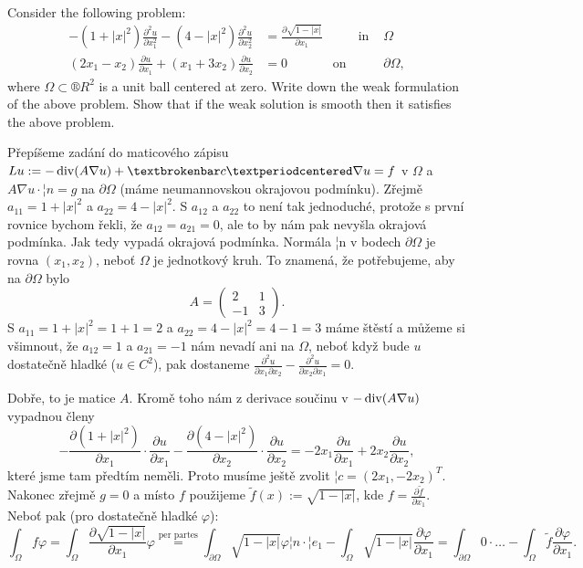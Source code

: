 \documentclass[12pt]{article}					%
\begin{document}
\begin{priklad}[2.]
	Consider the following problem:
	\begin{align*}
		-(1 + |x|^2) \frac{\partial^2 u}{\partial x_1^2} - (4 - |x|^2) \frac{\partial^2 u}{\partial x_2^2} &= \frac{\partial \sqrt{1 - |x|}}{\partial x_1} & \qquad \text{in } & Ω\\
		(2x_1 - x_2) \frac{\partial u}{\partial x_1} + (x_1 + 3x_2) \frac{\partial u}{\partial x_2} &= 0 \qquad & \text{on } & \partial Ω,
	\end{align*}
	where $Ω \subset ®R^2$ is a unit ball centered at zero. Write down the weak formulation of the above problem. Show that if the weak solution is smooth then it satisfies the above problem.

	\begin{reseni}
		Přepíšeme zadání do maticového zápisu $Lu := - \Div(A \nabla u) + ¦c·\nabla u = f$ v $Ω$ a $A\nabla u · ¦n = g$ na $\partial Ω$ (máme neumannovskou okrajovou podmínku). Zřejmě $a_{11} = 1 + |x|^2$ a $a_{22} = 4 - |x|^2$. S $a_{12}$ a $a_{22}$ to není tak jednoduché, protože s první rovnice bychom řekli, že $a_{12} = a_{21} = 0$, ale to by nám pak nevyšla okrajová podmínka. Jak tedy vypadá okrajová podmínka. Normála ¦n v bodech $\partial Ω$ je rovna $(x_1, x_2)$, neboť $Ω$ je jednotkový kruh. To znamená, že potřebujeme, aby na $\partial Ω$ bylo
		$$ A = \begin{pmatrix} 2 & 1 \\ -1 & 3 \end{pmatrix}. $$
		S $a_{11} = 1 + |x|^2 = 1 + 1 = 2$ a $a_{22} = 4 - |x|^2 = 4 - 1 = 3$ máme štěstí a můžeme si všimnout, že $a_{12} = 1$ a $a_{21} = -1$ nám nevadí ani na $Ω$, neboť když bude $u$ dostatečně hladké ($u \in C^2$), pak dostaneme $\frac{\partial^2 u}{\partial x_1 \partial x_2} - \frac{\partial^2 u}{\partial x_2 \partial x_1} = 0$.

		Dobře, to je matice $A$. Kromě toho nám z derivace součinu v $-\operatorname{div}(A \nabla u)$ vypadnou členy
		$$ -\frac{\partial (1 + |x|^2)}{\partial x_1}·\frac{\partial u}{\partial x_1} - \frac{\partial (4 - |x|^2)}{\partial x_2}·\frac{\partial u}{\partial x_2} = -2x_1 \frac{\partial u}{\partial x_1} + 2x_2 \frac{\partial u}{\partial x_2}, $$
		které jsme tam předtím neměli. Proto musíme ještě zvolit $¦c = (2x_1, -2x_2)^T$. Nakonec zřejmě $g = 0$ a místo $f$ použijeme $\tilde f(x) := \sqrt{1 - |x|}$, kde $f = \frac{\partial \tilde f}{\partial x_1}$. Neboť pak (pro dostatečně hladké $φ$):
		$$ \int_Ω f φ = \int_Ω \frac{\partial \sqrt{1 - |x|}}{\partial x_1} φ \overset{\text{per partes}}= \int_{\partial Ω} \sqrt{1 - |x|}φ ¦n·¦e_1 - \int_Ω \sqrt{1 - |x|} \frac{\partial φ}{\partial x_1} = \int_{\partial Ω} 0 · … - \int_Ω \tilde f \frac{\partial φ}{\partial x_1}. $$


\end{reseni}
\end{priklad}
\end{document}
